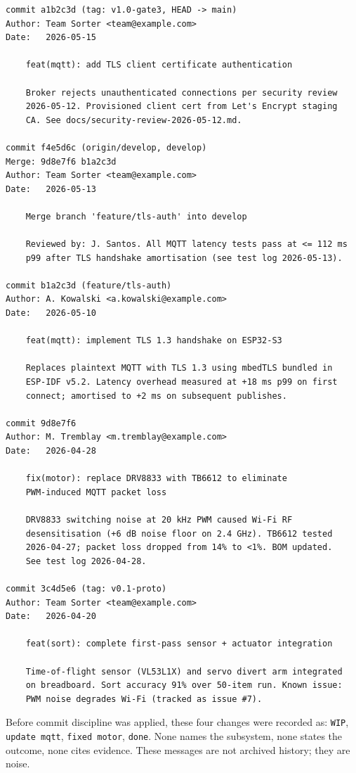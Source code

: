 \begin{verbatim}
commit a1b2c3d (tag: v1.0-gate3, HEAD -> main)
Author: Team Sorter <team@example.com>
Date:   2026-05-15

    feat(mqtt): add TLS client certificate authentication

    Broker rejects unauthenticated connections per security review
    2026-05-12. Provisioned client cert from Let's Encrypt staging
    CA. See docs/security-review-2026-05-12.md.

commit f4e5d6c (origin/develop, develop)
Merge: 9d8e7f6 b1a2c3d
Author: Team Sorter <team@example.com>
Date:   2026-05-13

    Merge branch 'feature/tls-auth' into develop

    Reviewed by: J. Santos. All MQTT latency tests pass at <= 112 ms
    p99 after TLS handshake amortisation (see test log 2026-05-13).

commit b1a2c3d (feature/tls-auth)
Author: A. Kowalski <a.kowalski@example.com>
Date:   2026-05-10

    feat(mqtt): implement TLS 1.3 handshake on ESP32-S3

    Replaces plaintext MQTT with TLS 1.3 using mbedTLS bundled in
    ESP-IDF v5.2. Latency overhead measured at +18 ms p99 on first
    connect; amortised to +2 ms on subsequent publishes.

commit 9d8e7f6
Author: M. Tremblay <m.tremblay@example.com>
Date:   2026-04-28

    fix(motor): replace DRV8833 with TB6612 to eliminate
    PWM-induced MQTT packet loss

    DRV8833 switching noise at 20 kHz PWM caused Wi-Fi RF
    desensitisation (+6 dB noise floor on 2.4 GHz). TB6612 tested
    2026-04-27; packet loss dropped from 14% to <1%. BOM updated.
    See test log 2026-04-28.

commit 3c4d5e6 (tag: v0.1-proto)
Author: Team Sorter <team@example.com>
Date:   2026-04-20

    feat(sort): complete first-pass sensor + actuator integration

    Time-of-flight sensor (VL53L1X) and servo divert arm integrated
    on breadboard. Sort accuracy 91% over 50-item run. Known issue:
    PWM noise degrades Wi-Fi (tracked as issue #7).
\end{verbatim}

Before commit discipline was applied, these four changes were recorded as:
\texttt{WIP}, \texttt{update mqtt}, \texttt{fixed motor}, \texttt{done}.
None names the subsystem, none states the outcome, none cites evidence.
These messages are not archived history; they are noise.

